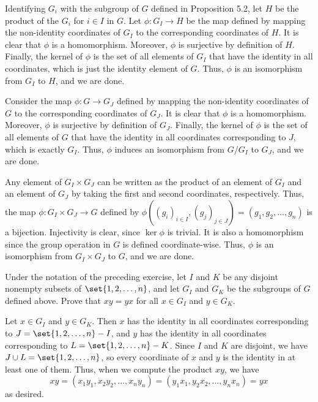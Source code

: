 \begin{solalph}
    \item Identifying $G_i$ with the subgroup of $G$ defined in Proposition 5.2, let $H$ be the product of the $G_i$ for $i \in I$ in $G$. Let $\phi : G_I \to H$ be the map defined by mapping the non-identity coordinates of $G_I$ to the corresponding coordinates of $H$. It is clear that $\phi$ is a homomorphism. Moreover, $\phi$ is surjective by definition of $H$. Finally, the kernel of $\phi$ is the set of all elements of $G_I$ that have the identity in all coordinates, which is just the identity element of $G$. Thus, $\phi$ is an isomorphism from $G_I$ to $H$, and we are done.
    \item Consider the map $\phi : G \to G_J$ defined by mapping the non-identity coordinates of $G$ to the corresponding coordinates of $G_J$. It is clear that $\phi$ is a homomorphism. Moreover, $\phi$ is surjective by definition of $G_J$. Finally, the kernel of $\phi$ is the set of all elements of $G$ that have the identity in all coordinates corresponding to $J$, which is exactly $G_I$. Thus, $\phi$ induces an isomorphism from $G/G_I$ to $G_J$, and we are done.
    \item Any element of $G_I \times G_J$ can be written as the product of an element of $G_I$ and an element of $G_J$ by taking the first and second coordinates, respectively. Thus, the map $\phi : G_I \times G_J \to G$ defined by $\phi((g_i)_{i \in I}, (g_j)_{j \in J}) = (g_1, g_2, \ldots, g_n)$ is a bijection. Injectivity is clear, since $\ker\phi$ is trivial. It is also a homomorphism since the group operation in $G$ is defined coordinate-wise. Thus, $\phi$ is an isomorphism from $G_I \times G_J$ to $G$, and we are done.
\end{solalph}

\newpage

\begin{exercise}\label{ex5.1.3}
    Under the notation of the preceding exercise, let $I$ and $K$ be any disjoint nonempty subsets of $\set{1, 2, \ldots, n}$, and let $G_I$ and $G_K$ be the subgroups of $G$ defined above. Prove that $xy = yx$ for all $x \in G_I$ and $y \in G_K$.
\end{exercise}

\begin{sol}
    Let $x \in G_I$ and $y \in G_K$. Then $x$ has the identity in all coordinates corresponding to $J = \set{1, 2, \ldots, n} - I$, and $y$ has the identity in all coordinates corresponding to $L = \set{1, 2, \ldots, n} - K$. Since $I$ and $K$ are disjoint, we have $J \cup L = \set{1, 2, \ldots, n}$, so every coordinate of $x$ and $y$ is the identity in at least one of them. Thus, when we compute the product $xy$, we have
    \[xy = (x_1y_1, x_2y_2, \ldots, x_ny_n) = (y_1x_1, y_2x_2, \ldots, y_nx_n) = yx\]
    as desired.
\end{sol}

